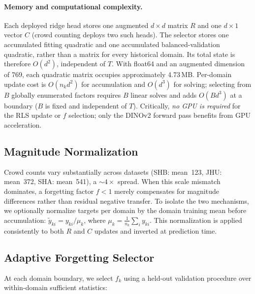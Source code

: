 \documentclass[10pt]{article}
\begin{document}
\paragraph{Memory and computational complexity.}
Each deployed ridge head stores one augmented $d{\times}d$ matrix $R$ and
one $d{\times}1$ vector $C$ (crowd counting deploys two such heads).  The
selector stores one accumulated fitting
quadratic and one accumulated balanced-validation quadratic, rather than a
matrix for every historical domain.  Its total state is therefore $O(d^2)$,
independent of $T$.  With float64 and an augmented dimension of 769, each
quadratic matrix occupies approximately 4.73\,MB.
Per-domain update cost is $O(n_k d^2)$ for accumulation and $O(d^3)$ for
solving; selecting from $B$ globally enumerated factors requires $B$ linear
solves and adds $O(Bd^3)$ at a boundary ($B$ is fixed and independent of $T$).
Critically, \emph{no GPU is required} for the RLS update or $f$ selection;
only the DINOv2 forward pass benefits from GPU acceleration.

\subsection{Magnitude Normalization}
\label{sec:norm}

Crowd counts vary substantially across datasets (SHB: mean~123,
JHU: mean~372, SHA: mean~541), a ${\sim}4\times$ spread.
When this scale mismatch dominates, a forgetting factor $f<1$ merely
compensates for magnitude differences rather than residual negative transfer.
To isolate the two mechanisms, we optionally normalize targets per domain
by the domain training mean before accumulation:
$\tilde{y}_{ki} = y_{ki} / \mu_k$, where $\mu_k =
\frac{1}{n_k}\sum_i y_{ki}$.
This normalization is applied consistently to both $R$ and $C$ updates
and inverted at prediction time.

\subsection{Adaptive Forgetting Selector}
\label{sec:adaptive}

At each domain boundary, we select $f_k$ using a held-out validation procedure
over within-domain
sufficient statistics:
\end{document}
